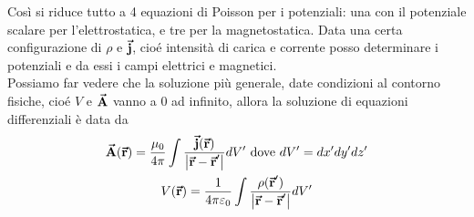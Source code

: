 Così si riduce tutto a 4 equazioni di Poisson per i potenziali: una con il potenziale scalare per l'elettrostatica, e tre per la magnetostatica. Data una certa configurazione di $\rho$ e $\vb*{\va{j}}$, cioé intensità di carica e corrente posso determinare i potenziali e da essi i campi elettrici e magnetici.\\

Possiamo far vedere che la soluzione più generale, date condizioni al contorno fisiche, cioé $V$ e $\vb*{\va{A}}$ vanno a $0$ ad infinito, allora la soluzione di equazioni differenziali è data da
\begin{gather*}
	\vb*{\va{A}}(\vb*{\va{r}})=\frac{\mu_0}{4\pi}\int\frac{\vb*{\va{j}}(\vb*{\va{r}})}{\abs{\vb*{\va{r}}-\vb*{\va{r}}'}} dV' \text{ dove } dV'=dx'dy'dz'\\
	V(\vb*{\va{r}})=\frac{1}{4\pi\varepsilon_0}\int \frac{\rho(\vb*{\va{r}}')}{\abs{\vb*{\va{r}}-\vb*{\va{r}}'}}dV'
\end{gather*}

